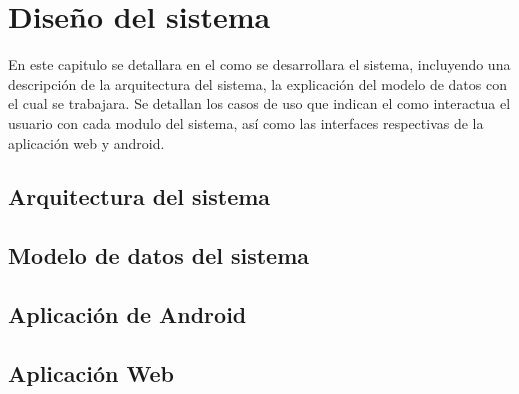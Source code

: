 \chapter{Diseño del sistema}
%

En este capitulo se detallara en el como se desarrollara el sistema, incluyendo una descripción de la arquitectura del sistema, la explicación del modelo de datos con el cual se trabajara. Se detallan los casos de uso que indican el como interactua el usuario con cada modulo del sistema, así como las interfaces respectivas de la aplicación web y android.
\section{Arquitectura del sistema}

\newpage
\section{Modelo de datos del sistema}

\newpage
\section{Aplicación de Android}

\newpage
\section{Aplicación Web}

\newpage

\newpage

